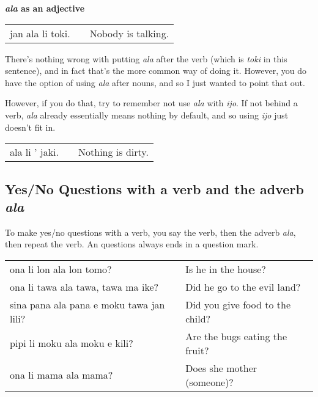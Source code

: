 \textbf{\textit{ala} as an adjective}

\begin{supertabular}{p{5,5cm}|ll}
jan ala li toki. && Nobody is talking. \\
\end{supertabular} 

There's nothing wrong with putting \textit{ala} after the verb (which is \textit{toki} in this sentence), and in fact that's the more common way of doing it. 
However, you do have the option of using \textit{ala} after nouns, and so I just wanted to point that out. 

However, if you do that, try to remember not use \textit{ala} with \textit{ijo}. 
If not behind a verb, \textit{ala} already essentially means nothing by default, and so using \textit{ijo} just doesn't fit in.

\begin{supertabular}{p{5,5cm}|ll}
ala li ' jaki. && Nothing is dirty. \\
\end{supertabular} 
%
%
{}
\subsection*{Yes/No Questions with a verb and the adverb \textit{ala}}

To make yes/no questions with a verb, you say the verb, then the adverb \textit{ala}, then repeat the verb. 
An questions always ends in a question mark.

\begin{supertabular}{p{5,5cm}|ll}
ona li lon ala lon tomo? && Is he in the house? \\
ona li tawa ala tawa, tawa ma ike? && Did he go to the evil land? \\
sina pana ala pana e moku tawa jan lili? && Did you give food to the child? \\
pipi li moku ala moku e kili? && Are the bugs eating the fruit? \\
ona li mama ala mama? && Does she mother (someone)? \\
\end{supertabular} 

